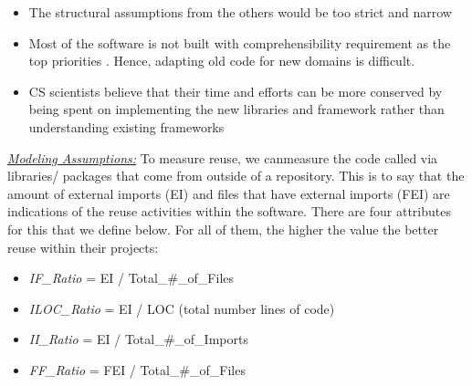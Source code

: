 \documentclass[sigconf,review,anonymous]{acmart}
\newcommand{\bi}{\begin{itemize}}
\newcommand{\ei}{\end{itemize}}
\begin{document}
\bi
\item The structural assumptions from the others would be too strict and narrow \cite{carver06_hpc, basili08_hpc}
\item Most of the software is not built with comprehensibility requirement as the top priorities \cite{segal07_problem}. Hence, adapting old code for new domains is difficult.
\item
CS scientists believe that their time and efforts can be more conserved by being spent on implementing the new libraries and framework rather than understanding existing frameworks
\ei



\noindent \textit{\underline{Modeling Assumptions:}} To
measure reuse, we canmeasure the  code called
via libraries/ packages that come from outside of a repository. This is to say that the amount of external imports (EI) and files that have external imports (FEI) are indications of the reuse activities within the software. There are four attributes for this that we define below. For all of them, the higher the value the better reuse within their projects: 

\bi
\item \textit{IF\_Ratio} = EI / Total\_\#\_of\_Files
\item \textit{ILOC\_Ratio} = EI / LOC (total number lines of code)
\item \textit{II\_Ratio} = EI / Total\_\#\_of\_Imports 
\item \textit{FF\_Ratio} = FEI / Total\_\#\_of\_Files
\ei
\end{document}
